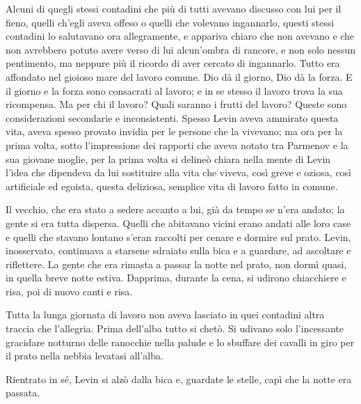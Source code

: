 Alcuni di quegli stessi contadini che più di tutti avevano discusso con lui per il fieno, quelli ch'egli aveva offeso o quelli che volevano ingannarlo, questi stessi contadini lo salutavano ora allegramente, e appariva chiaro che non avevano e che non avrebbero potuto avere verso di lui alcun'ombra di rancore, e non solo nessun pentimento, ma neppure più il ricordo di aver cercato di ingannarlo. Tutto era affondato nel gioioso mare del lavoro comune. Dio dà il giorno, Dio dà la forza. E il giorno e la forza sono consacrati al lavoro; e in se stesso il lavoro trova la sua ricompensa. Ma per chi il lavoro? Quali saranno i frutti del lavoro? Queste sono considerazioni secondarie e inconsistenti. Spesso Levin aveva ammirato questa vita, aveva spesso provato invidia per le persone che la vivevano; ma ora per la prima volta, sotto l'impressione dei rapporti che aveva notato tra Parmenov e la sua giovane moglie, per la prima volta si delineò chiara nella mente di Levin l'idea che dipendeva da lui sostituire alla vita che viveva, così greve e oziosa, così artificiale ed egoista, questa deliziosa, semplice vita di lavoro fatto in comune. 

Il vecchio, che era stato a sedere accanto a lui, già da tempo se n'era andato; la gente si era tutta dispersa. Quelli che abitavano vicini erano andati alle loro case e quelli che stavano lontano s'eran raccolti per cenare e dormire sul prato. Levin, inosservato, continuava a starsene sdraiato sulla bica e a guardare, ad ascoltare e riflettere. La gente che era rimasta a passar la notte nel prato, non dormì quasi, in quella breve notte estiva. Dapprima, durante la cena, si udirono chiacchiere e risa, poi di nuovo canti e risa. 

Tutta la lunga giornata di lavoro non aveva lasciato in quei contadini altra traccia che l'allegria. Prima dell'alba tutto si chetò. Si udivano solo l'incessante gracidare notturno delle ranocchie nella palude e lo sbuffare dei cavalli in giro per il prato nella nebbia levatasi all'alba. 

Rientrato in sé, Levin si alzò dalla bica e, guardate le stelle, capì che la notte era passata. 

